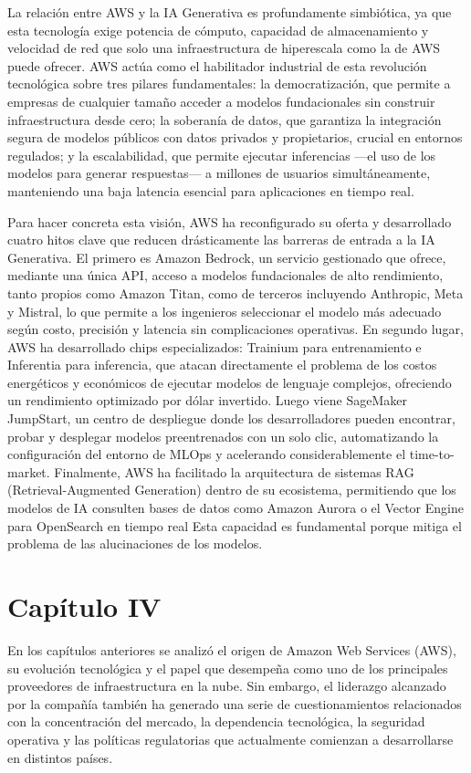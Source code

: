 \documentclass[12pt,a4paper]{article}
\begin{document}
La relación entre AWS y la IA Generativa es profundamente simbiótica, ya que esta tecnología exige potencia de cómputo, capacidad de almacenamiento y velocidad de red que solo una infraestructura de hiperescala como la de AWS puede ofrecer. AWS actúa como el habilitador industrial de esta revolución tecnológica sobre tres pilares fundamentales: la democratización, que permite a empresas de cualquier tamaño acceder a modelos fundacionales sin construir infraestructura desde cero; la soberanía de datos, que garantiza la integración segura de modelos públicos con datos privados y propietarios, crucial en entornos regulados; y la escalabilidad, que permite ejecutar inferencias —el uso de los modelos para generar respuestas— a millones de usuarios simultáneamente, manteniendo una baja latencia esencial para aplicaciones en tiempo real.

Para hacer concreta esta visión, AWS ha reconfigurado su oferta y desarrollado cuatro hitos clave que reducen drásticamente las barreras de entrada a la IA Generativa. El primero es Amazon Bedrock, un servicio gestionado que ofrece, mediante una única API, acceso a modelos fundacionales de alto rendimiento, tanto propios como Amazon Titan, como de terceros incluyendo Anthropic, Meta y Mistral, lo que permite a los ingenieros seleccionar el modelo más adecuado según costo, precisión y latencia sin complicaciones operativas. En segundo lugar, AWS ha desarrollado chips especializados: Trainium para entrenamiento e Inferentia para inferencia, que atacan directamente el problema de los costos energéticos y económicos de ejecutar modelos de lenguaje complejos, ofreciendo un rendimiento optimizado por dólar invertido. Luego viene SageMaker JumpStart, un centro de despliegue donde los desarrolladores pueden encontrar, probar y desplegar modelos preentrenados con un solo clic, automatizando la configuración del entorno de MLOps y acelerando considerablemente el time-to-market. Finalmente, AWS ha facilitado la arquitectura de sistemas RAG (Retrieval-Augmented Generation) dentro de su ecosistema, permitiendo que los modelos de IA consulten bases de datos como Amazon Aurora o el Vector Engine para OpenSearch en tiempo real Esta capacidad es fundamental porque mitiga el problema de las alucinaciones de los modelos.


\section{Capítulo IV}
En los capítulos anteriores se analizó el origen de Amazon Web Services (AWS), su evolución tecnológica y el papel que desempeña como uno de los principales proveedores de infraestructura en la nube. Sin embargo, el liderazgo alcanzado por la compañía también ha generado una serie de cuestionamientos relacionados con la concentración del mercado, la dependencia tecnológica, la seguridad operativa y las políticas regulatorias que actualmente comienzan a desarrollarse en distintos países.
\end{document}
